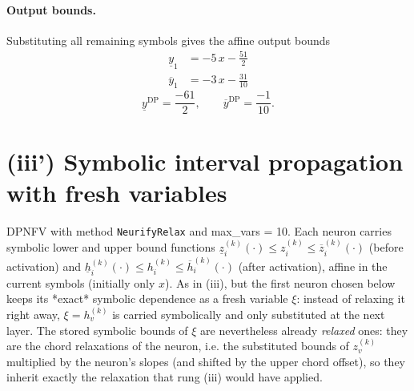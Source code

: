\documentclass[11pt]{article}
\begin{document}
\paragraph{Output bounds.}
Substituting all remaining symbols gives the affine output bounds
\begin{align*}
\underline{y}_{1} &= -5\,x - \frac{51}{2}
\end{align*}
\begin{align*}
\overline{y}_{1} &= -3\,x - \frac{31}{10}
\end{align*}
\begin{equation*}
\underline{y}^{\text{DP}} = \frac{-61}{2}, \qquad \overline{y}^{\text{DP}} = \frac{-1}{10}.
\end{equation*}

\section{(iii') Symbolic interval propagation with fresh variables}
DPNFV with method \texttt{NeurifyRelax} and max\_vars = 10. Each neuron carries symbolic lower and upper bound functions
$\underline{z}^{(k)}_i(\cdot) \le z^{(k)}_i \le \overline{z}^{(k)}_i(\cdot)$ (before activation)
and $\underline{h}^{(k)}_i(\cdot) \le h^{(k)}_i \le \overline{h}^{(k)}_i(\cdot)$ (after activation),
affine in the current symbols (initially only $x$).
As in (iii), but the first neuron chosen below keeps its *exact*
symbolic dependence as a fresh variable $\xi$: instead of relaxing it right away, $\xi = h^{(k)}_v$
is carried symbolically and only substituted at the next layer. The stored symbolic bounds of $\xi$
are nevertheless already \emph{relaxed} ones: they are the chord relaxations of the neuron, i.e.
the substituted bounds of $z^{(k)}_v$ multiplied by the neuron's slopes (and shifted by the upper
chord offset), so they inherit exactly the relaxation that rung (iii) would have applied.
\end{document}
